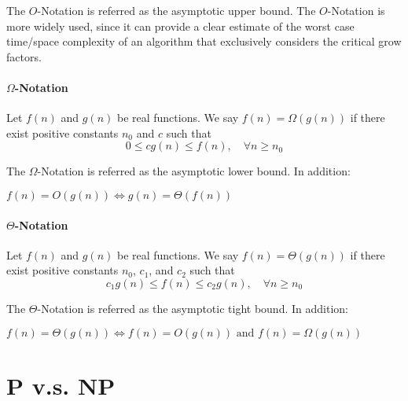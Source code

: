                     The $O$-Notation is referred as the asymptotic upper bound. The $O$-Notation is more widely used, since it can provide a clear estimate of the worst case time/space complexity of an algorithm that exclusively considers the critical grow factors.

                \paragraph{$\Omega$-Notation}
                    Let $f(n)$ and $g(n)$ be real functions. We say $f(n) = \Omega(g(n))$ if there exist positive constants $n_0$ and $c$ such that
                    \begin{equation*}
                        0 \le cg(n) \le f(n), \quad \forall n \ge n_0
                    \end{equation*}

                    The $\Omega$-Notation is referred as the asymptotic lower bound. In addition:

                    \begin{theorem}
                        $f(n) = O(g(n)) \Leftrightarrow g(n) = \Theta(f(n))$
                    \end{theorem}
                
                \paragraph{$\Theta$-Notation}
                    Let $f(n)$ and $g(n)$ be real functions. We say $f(n) = \Theta(g(n))$ if there exist positive constants $n_0$, $c_1$, and $c_2$ such that
                    \begin{equation*}
                        c_1g(n) \le f(n) \le c_2g(n), \quad \forall n \ge n_0
                    \end{equation*}

                    The $\Theta$-Notation is referred as the asymptotic tight bound. In addition:

                    \begin{theorem}
                        $f(n) = \Theta(g(n)) \Leftrightarrow f(n) = O(g(n)) \text{ and } f(n) = \Omega(g(n))$
                    \end{theorem}

        \section{P v.s. NP}
